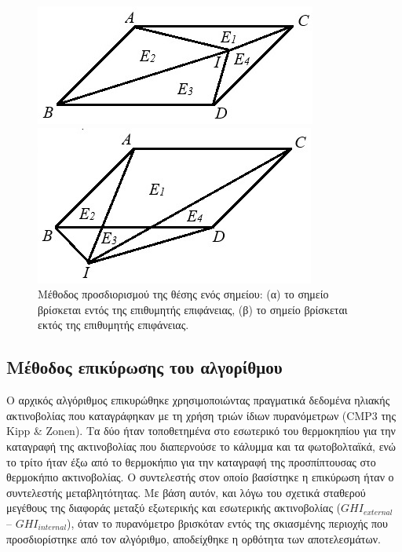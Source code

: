 \documentclass[12pt, a4paper]{report} %
\newcommand{\english}{\foreignlanguage{english}}
\begin{document}
\begin{figure}[H]
    \begin{minipage}[c]{.5\textwidth}
\centering
      \includegraphics[width=0.9\linewidth]{method_in.jpg}
      \caption*{\hspace{35pt}(α)}{}
    \end{minipage}%
    \begin{minipage}[c]{0.5\textwidth}
\centering
      \includegraphics[width=0.9\linewidth]{method_out.jpg}
      \caption*{\hspace{35pt}(β)}{}
    \end{minipage}
\caption{Μέθοδος προσδιορισμού της θέσης ενός σημείου: (α) το σημείο βρίσκεται εντός της επιθυμητής επιφάνειας, (β) το σημείο 
βρίσκεται εκτός της επιθυμητής επιφάνειας.}
\label{fig_methods}
\end{figure}

\subsection{Μέθοδος επικύρωσης του αλγορίθμου}\label{sub_alg_advanc_valid}

Ο αρχικός αλγόριθμος επικυρώθηκε χρησιμοποιώντας πραγματικά δεδομένα ηλιακής ακτινοβολίας που καταγράφηκαν με τη χρήση τριών 
ίδιων πυρανόμετρων (\english{CMP3} της \english{Kipp \& Zonen}). Τα δύο ήταν τοποθετημένα στο εσωτερικό του θερμοκηπίου για την 
καταγραφή της ακτινοβολίας που διαπερνούσε το κάλυμμα και τα φωτοβολταϊκά, ενώ το τρίτο ήταν έξω από το θερμοκήπιο για την 
καταγραφή της προσπίπτουσας στο θερμοκήπιο ακτινοβολίας. Ο συντελεστής στον οποίο βασίστηκε η επικύρωση ήταν ο συντελεστής 
μεταβλητότητας. Με βάση αυτόν, και λόγω του σχετικά σταθερού μεγέθους της διαφοράς μεταξύ 
εξωτερικής και εσωτερικής ακτινοβολίας (\english{$GHI_{external}$ – $GHI_{internal}$}), όταν το πυρανόμετρο βρισκόταν εντός της 
σκιασμένης περιοχής που προσδιορίστηκε από τον αλγόριθμο, αποδείχθηκε η ορθότητα των αποτελεσμάτων.
\end{document}
